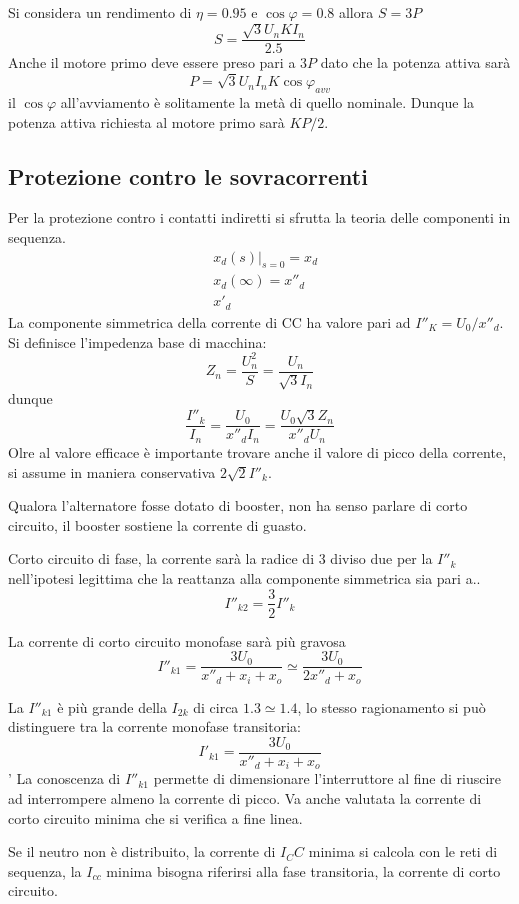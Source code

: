 Si considera un rendimento di $\eta=0.95$ e $\cos\varphi=0.8$ allora $S=3P$
$$
S = \frac{\sqrt{3} U_n K I_n}{2.5}
$$
Anche il motore primo deve essere preso pari a $3P$ dato che la potenza attiva sarà
$$
P = \sqrt{3} U_n I_n K \cos\varphi_{avv}
$$
il $\cos\varphi$ all'avviamento è solitamente la metà di quello nominale.
Dunque la potenza attiva richiesta al motore primo sarà $KP/2$.

\subsection{Protezione contro le sovracorrenti}
Per la protezione contro i contatti indiretti si sfrutta la teoria delle 
componenti in sequenza.
$$
\begin{aligned}
    &\left.x_d(s)\right|_{s=0} = x_d \\
    &x_d(\infty) = x''_d\\
    &x'_d
\end{aligned}
    $$
La componente simmetrica della corrente di CC ha valore pari ad $I''_K = U_0/x''_d$.
Si definisce l'impedenza base di macchina:
$$
Z_n = \frac{U_n^2}{S} = \frac{U_n}{\sqrt{3}I_n}
$$
dunque 
$$
\frac{I''_k}{I_n} = \frac{U_0}{x''_dI_n} = \frac{U_0\sqrt{3}Z_n}{x''_dU_n}
$$
Olre al valore efficace è importante trovare anche il valore di picco della 
corrente, si assume in maniera conservativa $2\sqrt{2}I''_k$.

Qualora l'alternatore fosse dotato di booster, non ha senso parlare di corto 
circuito, il booster sostiene la corrente di guasto.


Corto circuito di fase, la corrente sarà la radice di 3 diviso due per la $I''_k$ nell'ipotesi legittima che la reattanza alla componente simmetrica sia pari a..
$$
I''_{k2} =\frac{3}{2}I''_k
$$

La corrente di corto circuito monofase sarà più gravosa
$$
I''_{k1} = \frac{3U_0}{x''_d + x_i + x_o} \simeq \frac{3U_0}{2x''_d + x_o}
$$

La $I''_{k1}$ è più grande della $I_{2k}$ di circa $1.3 \simeq 1.4$, lo stesso ragionamento si può distinguere tra la corrente monofase transitoria:
$$
I'_{k1} = \frac{3U_0}{x''_d + x_i +  x_o}
$$'
La conoscenza di $I''_{k1}$ permette di dimensionare l'interruttore al fine di riuscire ad interrompere almeno la corrente di picco.
Va anche valutata la corrente di corto circuito minima che si verifica a fine linea.

Se il neutro non è distribuito, la corrente di $I_CC$ minima si calcola con le 
reti di sequenza,
la $I_{cc}$ minima bisogna riferirsi alla fase transitoria, la corrente di 
corto circuito.

